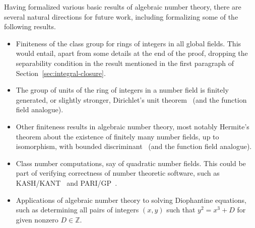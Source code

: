 \documentclass[a4paper,USenglish,cleveref, autoref, thm-restate]{lipics-v2021}
\newcommand{\Z}{\mathbb{Z}}
\begin{document}
Having formalized various basic results of algebraic number theory, there are several natural directions for future work, including formalizing some of the following results.
\begin{itemize}
\item Finiteness of the class group for rings of integers in all global fields. This would entail, apart from some details at the end of the proof, dropping the separability condition in the result mentioned in the first paragraph of Section~\ref{sec:integral-closure}. 

\item The group of units of the ring of integers in a number field is finitely generated, or slightly stronger, Dirichlet's unit theorem~\cite[Theorem 7.4]{Neukirch} (and the function field analogue).

\item Other finiteness results in algebraic number theory, most notably Hermite's theorem about the existence of finitely many number fields, up to isomorphism,
with bounded discriminant~\cite[Theorem 2.16]{Neukirch} (and the function field analogue).

\item Class number computations, say of quadratic number fields.
This could be part of verifying correctness of number theoretic software, such as KASH/KANT~\cite{kash} and PARI/GP~\cite{PARI2}.

\item Applications of algebraic number theory to solving Diophantine equations, such as determining all pairs of integers $(x,y)$ such that $y^2=x^3+D$ for %
given nonzero $D \in \Z$.
\end{itemize}
\end{document}
